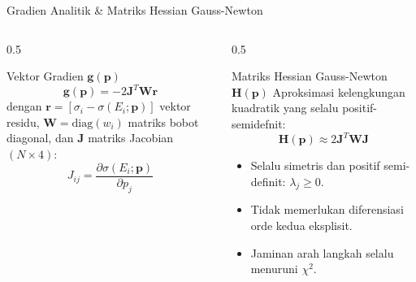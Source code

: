 \documentclass[aspectratio=169, 10pt]{beamer}
\begin{document}
\begin{frame}{Gradien Analitik \& Matriks Hessian Gauss-Newton}
	\begin{columns}[T]
		\begin{column}{0.5\textwidth}
			\begin{block}{Vektor Gradien $\mathbf{g}(\mathbf{p})$}
				\small
				\begin{equation}
					\mathbf{g}(\mathbf{p}) = -2\mathbf{J}^T\mathbf{W}\mathbf{r}
				\end{equation}
				\footnotesize
				dengan $\mathbf{r} = [\sigma_i - \sigma(E_i;\mathbf{p})]$ vektor residu, $\mathbf{W} = \mathrm{diag}(w_i)$ matriks bobot diagonal, dan $\mathbf{J}$ matriks Jacobian $(N\times 4)$:
				\begin{equation*}
					J_{ij} = \frac{\partial\sigma(E_i;\mathbf{p})}{\partial p_j}
				\end{equation*}
			\end{block}
		\end{column}

		\begin{column}{0.5\textwidth}
			\begin{alertblock}{Matriks Hessian Gauss-Newton $\mathbf{H}(\mathbf{p})$}
				\small
				Aproksimasi kelengkungan kuadratik yang selalu positif-semidefnit:
				\begin{equation}
					\mathbf{H}(\mathbf{p}) \approx 2\mathbf{J}^T\mathbf{W}\mathbf{J}
				\end{equation}
				\footnotesize
				\begin{itemize}
					\item Selalu simetris dan positif semi-definit: $\lambda_j \ge 0$.
					\item Tidak memerlukan diferensiasi orde kedua eksplisit.
					\item Jaminan arah langkah selalu menuruni $\chi^2$.
				\end{itemize}
			\end{alertblock}
		\end{column}
	\end{columns}
\end{frame}
\end{document}
